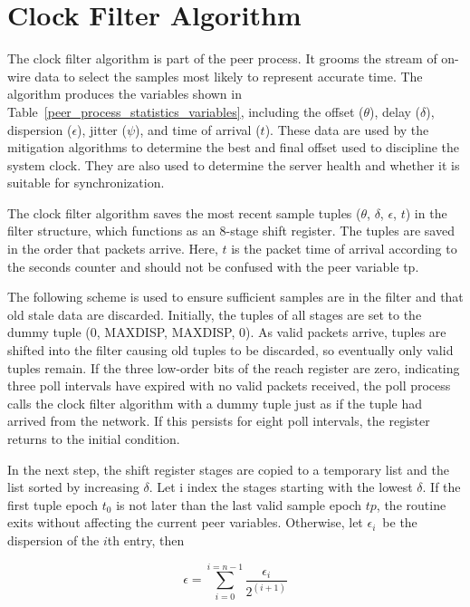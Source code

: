 \chapter{Clock Filter Algorithm}
\label{section-10}

The clock filter algorithm is part of the peer process.  It grooms
the stream of on-wire data to select the samples most likely to
represent accurate time.  The algorithm produces the variables shown
in Table~\ref{peer_process_statistics_variables}, including the offset ($ \theta $), delay ($ \delta $), dispersion
($ \epsilon $), jitter ($ \psi $), and time of arrival ($ t $).  These data are
used by the mitigation algorithms to determine the best and final
offset used to discipline the system clock.  They are also used to
determine the server health and whether it is suitable for
synchronization.

The clock filter algorithm saves the most recent sample tuples
($ \theta $, $ \delta $, $ \epsilon $, $ t $) in the filter structure, which functions
as an 8-stage shift register.  The tuples are saved in the order that
packets arrive.  Here, $ t $ is the packet time of arrival according to
the seconds counter and should not be confused with the peer variable
tp.

The following scheme is used to ensure sufficient samples are in the
filter and that old stale data are discarded.  Initially, the tuples
of all stages are set to the dummy tuple (0, MAXDISP, MAXDISP, 0).
As valid packets arrive, tuples are shifted into the filter causing
old tuples to be discarded, so eventually only valid tuples remain.
If the three low-order bits of the reach register are zero,
indicating three poll intervals have expired with no valid packets
received, the poll process calls the clock filter algorithm with a
dummy tuple just as if the tuple had arrived from the network.  If
this persists for eight poll intervals, the register returns to the
initial condition.

In the next step, the shift register stages are copied to a temporary
list and the list sorted by increasing $ \delta $.  Let i index the stages
starting with the lowest $ \delta $.  If the first tuple epoch $t_0 $ is not
later than the last valid sample epoch $ tp $, the routine exits without
affecting the current peer variables.  Otherwise, let $ \epsilon_i $\ be
the dispersion of the $ i $th entry, then

$$
\epsilon = \sum^{i = n - 1}_{i = 0} \frac{\epsilon_i}{2^{(i + 1)}}
$$


